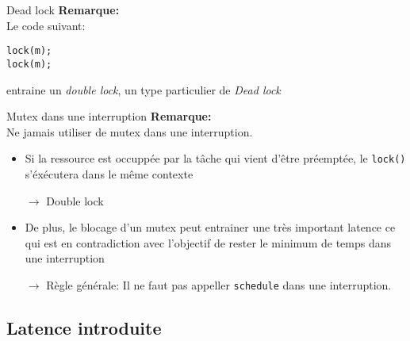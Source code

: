 \begin{frame}[fragile]{Dead lock}
  \textbf{Remarque:} \\
  Le code suivant:
  \begin{lstlisting}
lock(m);
lock(m);
  \end{lstlisting}
  entraine un  \emph{double lock},  un type particulier  de \emph{Dead
    lock}
\end{frame}

\begin{frame}[fragile]{Mutex dans une interruption}
  \textbf{Remarque:} \\
  Ne jamais utiliser de mutex dans une interruption.
  \begin{itemize}
  \item Si  la ressource  est occuppée par  la tâche qui  vient d'être
    préemptée, le \texttt{lock()} s'éxécutera dans le même contexte
  \item[$\rightarrow$] Double lock
  \item De plus,  le blocage d'un mutex peut entrainer
    une  très  important latence  ce  qui  est  en contradiction  avec
    l'objectif de rester le minimum de temps dans une interruption
  \item[$\rightarrow$] Règle générale: Il ne faut pas appeller \texttt{schedule} dans une interruption.
  \end{itemize}
\end{frame}

\subsection{Latence introduite}

